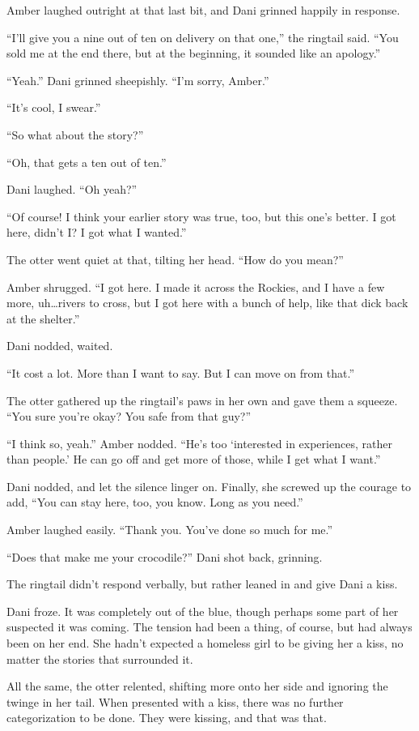 Amber laughed outright at that last bit, and Dani grinned happily in response.

``I'll give you a nine out of ten on delivery on that one,'' the ringtail said. ``You sold me at the end there, but at the beginning, it sounded like an apology.''

``Yeah.'' Dani grinned sheepishly. ``I'm sorry, Amber.''

``It's cool, I swear.''

``So what about the story?''

``Oh, that gets a ten out of ten.''

Dani laughed. ``Oh yeah?''

``Of course! I think your earlier story was true, too, but this one's better. I got here, didn't I? I got what I wanted.''

The otter went quiet at that, tilting her head. ``How do you mean?''

Amber shrugged. ``I got here. I made it across the Rockies, and I have a few more, uh\ldots{}rivers to cross, but I got here with a bunch of help, like that dick back at the shelter.''

Dani nodded, waited.

``It cost a lot. More than I want to say. But I can move on from that.''

The otter gathered up the ringtail's paws in her own and gave them a squeeze. ``You sure you're okay? You safe from that guy?''

``I think so, yeah.'' Amber nodded. ``He's too `interested in experiences, rather than people.' He can go off and get more of those, while I get what I want.''

Dani nodded, and let the silence linger on. Finally, she screwed up the courage to add, ``You can stay here, too, you know. Long as you need.''

Amber laughed easily. ``Thank you. You've done so much for me.''

``Does that make me your crocodile?'' Dani shot back, grinning.

The ringtail didn't respond verbally, but rather leaned in and give Dani a kiss.

Dani froze. It was completely out of the blue, though perhaps some part of her suspected it was coming. The tension had been a thing, of course, but had always been on her end. She hadn't expected a homeless girl to be giving her a kiss, no matter the stories that surrounded it.

All the same, the otter relented, shifting more onto her side and ignoring the twinge in her tail. When presented with a kiss, there was no further categorization to be done. They were kissing, and that was that.

